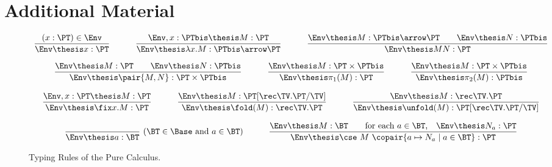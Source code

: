 \section{Additional Material}
\label{sec:app}

\begin{figure}[t!]
\[
\begin{array}{c}
\dfrac{(x:\PT) \in \Env}
  {\Env \thesis x:\PT}

\qquad\quad

\dfrac{\Env,x:\PTbis \thesis M : \PT}
  {\Env \thesis \lambda x.M : \PTbis \arrow \PT}

\qquad\quad

\dfrac{\Env \thesis M : \PTbis \arrow \PT
  \qquad
  \Env \thesis N : \PTbis}
  {\Env \thesis M N : \PT}

\\\\

\dfrac{\Env \thesis M : \PT
  \qquad
  \Env \thesis N : \PTbis}
  {\Env \thesis \pair{M,N} : \PT \times \PTbis}

\qquad\quad

\dfrac{\Env \thesis M : \PT \times \PTbis}
  {\Env \thesis \pi_1(M) : \PT}

\qquad\quad

\dfrac{\Env \thesis M : \PT \times \PTbis}
  {\Env \thesis \pi_2(M) : \PTbis}

\\\\

\dfrac{\Env,x:\PT \thesis M : \PT}
  {\Env \thesis \fix x.M : \PT}

\qquad\quad

\dfrac{\Env \thesis M : \PT[\rec\TV.\PT/\TV]}
  {\Env \thesis \fold(M) : \rec\TV.\PT}

\qquad\quad

\dfrac{\Env \thesis M : \rec\TV.\PT}
  {\Env \thesis \unfold(M) : \PT[\rec\TV.\PT/\TV]}

\\\\

\dfrac{}
  {\Env \thesis a : \BT}
~\text{($\BT \in \Base$ and $a \in \BT$)}

\qquad\quad

\dfrac{ \Env \thesis M : \BT
  \qquad\text{for each $a \in \BT$,\quad} \Env \thesis N_a : \PT}
  {\Env \thesis \cse\ M\ \copair{a \mapsto N_a \mid a \in \BT} : \PT}

\end{array}
\]
\caption{Typing Rules of the Pure Calculus.%
\label{fig:app:puretyping}}
\end{figure}

